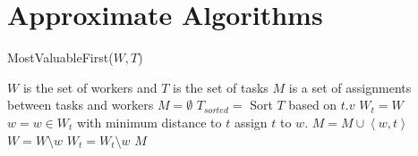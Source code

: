 \section{Approximate Algorithms}

\begin{algorithm}[t]
\caption{MostValuableFirst($W, T$)}
\label{algo:MVF}
\begin{algorithmic}[1]
\REQUIRE $W$ is the set of workers and $T$ is the set of tasks
\ENSURE $M$ is a set of assignments between tasks and workers
\STATE $M = \emptyset$
\STATE $T_{sorted} = $ Sort $T$ based on $t.v$
	\STATE $W_t = W$
		\STATE $w = w \in W_t$ with minimum distance to $t$
			\STATE assign $t$ to $w$.
			\STATE $M = M \cup \left\langle w, t \right\rangle$
				\STATE $W = W \setminus w$
			\ENDIF
		\ELSE
			\STATE $W_t = W_t \setminus w$
		\ENDIF
	\ENDWHILE
\ENDWHILE
\RETURN $M$
\end{algorithmic}
\end{algorithm}